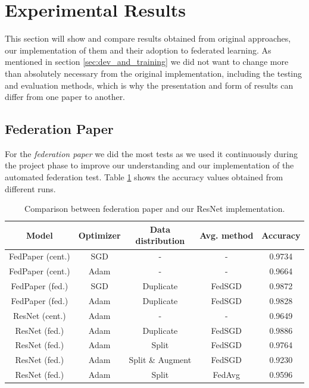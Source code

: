 \section{Experimental Results}
This section will show and compare results obtained from original approaches, our implementation of them and their adoption to federated learning. As mentioned in section \ref{sec:dev_and_training} we did not want to change more than absolutely necessary from the original implementation, including the testing and evaluation methods, which is why the presentation and form of results can differ from one paper to another.


\subsection{Federation Paper}\label{subsec:results_federation_paper}
For the \textit{federation paper} we did the most tests as we used it continuously during the project phase to improve our understanding and our implementation of the automated federation test. Table \ref{tab:results_federation_paper} shows the accuracy values obtained from different runs.

\begin{table}[htbp]
    \small
    \centering
    \caption{Comparison between federation paper\cite{federated_machine_learning} and our ResNet implementation.}
    \begin{tabular}{c|c|c|c|c}
        Model & Optimizer & \shortstack[c]{Data\\distribution} & Avg. method & Accuracy\\
        \hline
        FedPaper (cent.) & SGD & - & - & 0.9734 \\
        FedPaper (cent.) & Adam & - & - & 0.9664 \\
        FedPaper (fed.) & SGD & Duplicate & FedSGD & 0.9872\\
        FedPaper (fed.) & Adam & Duplicate & FedSGD & 0.9828\\
        ResNet (cent.) & Adam & - & - & 0.9649 \\
        ResNet (fed.) & Adam & Duplicate & FedSGD & 0.9886 \\
        ResNet (fed.) & Adam & Split & FedSGD & 0.9764 \\
        ResNet (fed.) & Adam & Split \& Augment & FedSGD & 0.9230 \\
        ResNet (fed.) & Adam & Split & FedAvg & 0.9596 \\
    \end{tabular}
    \label{tab:results_federation_paper}
\end{table}

